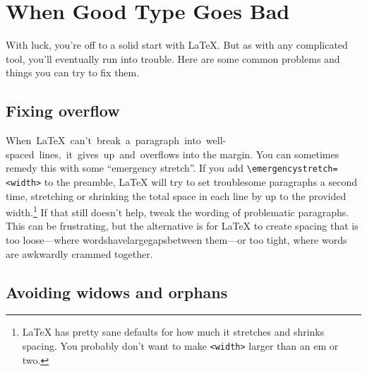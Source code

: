 \chapter{When Good Type Goes Bad}

With luck, you're off to a solid start with \LaTeX.
But as with any complicated tool, you'll eventually run into trouble.
Here are some common problems and things you can try to fix them.

\section{Fixing overflow}

\mbox{When \LaTeX{} can't break a paragraph into well-spaced lines,
it gives up and overflows} into the margin.
You can sometimes remedy this with some ``emergency stretch''\quotekern.
If you add \texttt{\textbackslash emergencystretch=\allowbreak<width>}
to the preamble,
\LaTeX{} will try to set troublesome paragraphs a second time,
stretching or shrinking the total space in each line by up to the provided
width.\punckern\footnote{\LaTeX{} has pretty sane defaults for how much
it stretches and shrinks spacing.
You probably don't want to make \texttt{<width>} larger than an em or two.}
If that still doesn't help, tweak the wording of problematic paragraphs.
This can be frustrating, but the alternative is for \LaTeX{} to create spacing
that is too loose---where\quad
words\quad have\quad large\quad gaps\quad between\quad
them---or too tight, where\! words\! are\! awkwardly\! crammed\! together.

\section{Avoiding widows and orphans}

